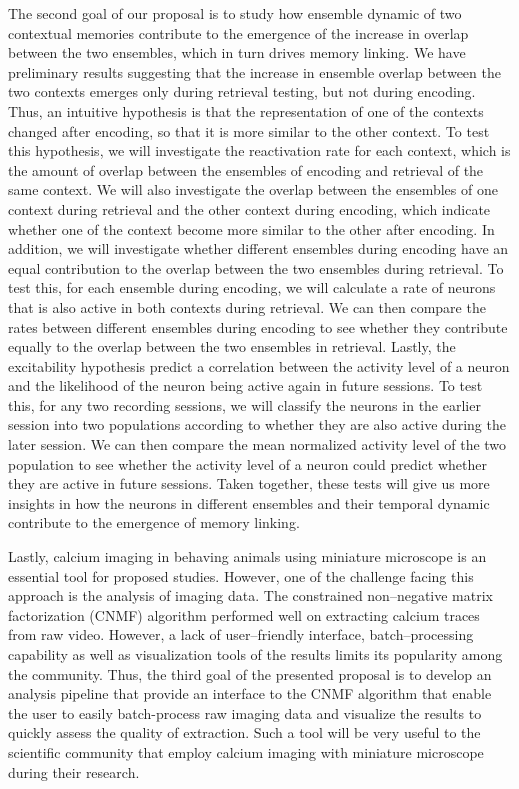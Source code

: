 \documentclass[master.tex]{subfiles}
\begin{document}
The second goal of our proposal is to study how ensemble dynamic of two
contextual memories contribute to the emergence of the increase in overlap
between the two ensembles, which in turn drives memory linking. We have
preliminary results suggesting that the increase in ensemble overlap between the
two contexts emerges only during retrieval testing, but not during encoding.
Thus, an intuitive hypothesis is that the representation of one of the contexts
changed after encoding, so that it is more similar to the other context. To test
this hypothesis, we will investigate the reactivation rate for each context,
which is the amount of overlap between the ensembles of encoding and retrieval
of the same context. We will also investigate the overlap between the ensembles
of one context during retrieval and the other context during encoding, which
indicate whether one of the context become more similar to the other after
encoding. In addition, we will investigate whether different ensembles during
encoding have an equal contribution to the overlap between the two ensembles
during retrieval. To test this, for each ensemble during encoding, we will
calculate a rate of neurons that is also active in both contexts during
retrieval. We can then compare the rates between different ensembles during
encoding to see whether they contribute equally to the overlap between the two
ensembles in retrieval. Lastly, the excitability hypothesis predict a
correlation between the activity level of a neuron and the likelihood of the
neuron being active again in future sessions. To test this, for any two
recording sessions, we will classify the neurons in the earlier session into two
populations according to whether they are also active during the later session.
We can then compare the mean normalized activity level of the two population to
see whether the activity level of a neuron could predict whether they are active
in future sessions. Taken together, these tests will give us more insights in
how the neurons in different ensembles and their temporal dynamic contribute to
the emergence of memory linking.

Lastly, calcium imaging in behaving animals using miniature microscope is an
essential tool for proposed studies. However, one of the challenge facing this
approach is the analysis of imaging data. The constrained non--negative matrix
factorization (CNMF) algorithm performed well on extracting calcium traces from
raw video. However, a lack of user--friendly interface, batch--processing
capability as well as visualization tools of the results limits its popularity
among the community. Thus, the third goal of the presented proposal is to
develop an analysis pipeline that provide an interface to the CNMF algorithm
that enable the user to easily batch-process raw imaging data and visualize the
results to quickly assess the quality of extraction. Such a tool will be very
useful to the scientific community that employ calcium imaging with miniature
microscope during their research.
\end{document}
